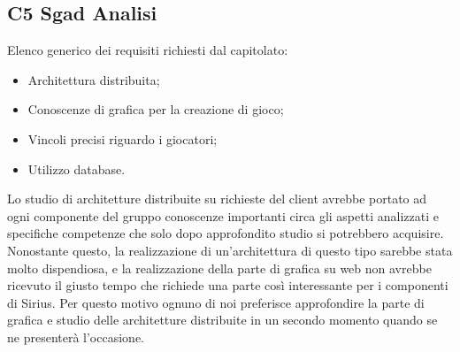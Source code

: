 \subsection{C5 Sgad Analisi}
Elenco generico dei requisiti richiesti dal capitolato:
\begin{itemize} 
\item Architettura distribuita;
\item Conoscenze di grafica per la creazione di gioco;
\item Vincoli precisi riguardo i giocatori;
\item Utilizzo database.
\end{itemize}
Lo studio di architetture distribuite su richieste del client avrebbe portato ad ogni componente del gruppo conoscenze importanti circa gli aspetti analizzati e specifiche competenze che solo dopo approfondito studio si potrebbero acquisire. Nonostante questo, la realizzazione di un'architettura di questo tipo sarebbe stata molto dispendiosa, e la realizzazione della parte di grafica su web non avrebbe ricevuto il giusto tempo che richiede una parte così interessante per i componenti di Sirius. Per questo motivo ognuno di noi preferisce approfondire la parte di grafica e studio delle architetture distribuite in un secondo momento quando se ne presenterà l'occasione.\\
